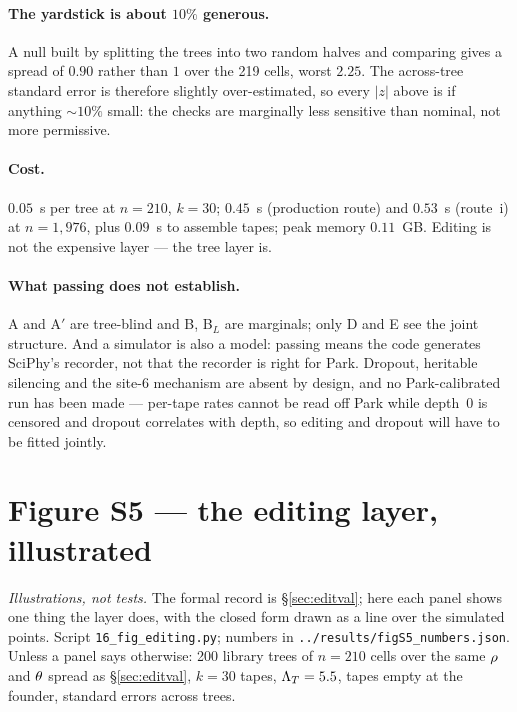 \paragraph{The yardstick is about $10\%$ generous.} A null built by splitting the trees into two random
halves and comparing gives a spread of $0.90$ rather than $1$ over the 219 cells, worst $2.25$. The
across-tree standard error is therefore slightly over-estimated, so every $|z|$ above is if anything
$\sim10\%$ small: the checks are marginally less sensitive than nominal, not more permissive.

\paragraph{Cost.} $0.05$~s per tree at $n=210$, $k=30$; $0.45$~s (production route) and $0.53$~s
(route~i) at $n=1{,}976$, plus $0.09$~s to assemble tapes; peak memory $0.11$~GB. Editing is not the
expensive layer --- the tree layer is.

\paragraph{What passing does not establish.} A and A$'$ are tree-blind and B, B$_L$ are marginals;
only D and E see the joint structure. And a simulator is also a model: passing means the code
generates SciPhy's recorder, not that the recorder is right for Park. Dropout, heritable silencing and
the site-6 mechanism are absent by design, and no Park-calibrated run has been made --- per-tape rates
cannot be read off Park while depth~0 is censored and dropout correlates with depth, so editing and
dropout will have to be fitted jointly.

\section{Figure S5 --- the editing layer, illustrated}\label{sec:S5}

\emph{Illustrations, not tests.} The formal record is \S\ref{sec:editval}; here each panel shows one
thing the layer does, with the closed form drawn as a line over the simulated points. Script
\texttt{16\_fig\_editing.py}; numbers in \texttt{../results/figS5\_numbers.json}. Unless a panel says
otherwise: 200 library trees of $n=210$ cells over the same $\rho$ and $\theta$ spread as
\S\ref{sec:editval}, $k=30$ tapes, $\Lambda_T=5.5$, tapes empty at the founder, standard errors across
trees.

